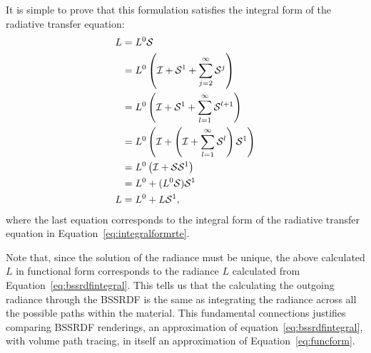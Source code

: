 It is simple to prove that this formulation satisfies the integral form of the radiative transfer equation:
\begin{equation*}
\begin{split}
L &= L^0 \mathcal{S} \\
&= L^0 \left(\mathcal{I} + \mathcal{S}^1 + \sum_{j=2}^\infty \mathcal{S}^j \right) \\
&= L^0 \left( \mathcal{I} + \mathcal{S}^1 + \sum_{l=1}^\infty \mathcal{S}^{l+1} \right) \\
&= L^0 \left( \mathcal{I} + \left( \mathcal{I} + \sum_{l=1}^\infty \mathcal{S}^l \right) \mathcal{S}^1 \right)  \\
&= L^0 \left( \mathcal{I} + \mathcal{S} \mathcal{S}^1 \right)  \\
&= L^0 + (L^0 \mathcal{S}) \mathcal{S}^1   \\
L &= L^0 + L \mathcal{S}^1,   \\
\end{split}
\end{equation*}
where the last equation corresponds to the integral form of the radiative transfer equation in Equation~\ref{eq:integralformrte}.

Note that, since the solution of the radiance must be unique, the above calculated $L$ in functional form corresponds to the radiance $L$ calculated from Equation~\ref{eq:bssrdfintegral}. This tells us that the calculating the outgoing radiance through the BSSRDF is the same as integrating the radiance across all the possible paths within the material. This fundamental connections justifies comparing BSSRDF renderings, an approximation of equation~\ref{eq:bssrdfintegral}, with volume path tracing, in itself an approximation of Equation~\ref{eq:funcform}.

